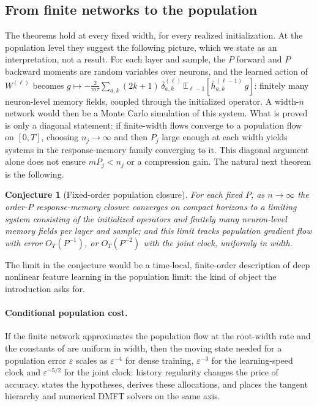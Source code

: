 \documentclass[11pt]{article}
\newtheorem{conjecture}[theorem]{Conjecture}
\theoremstyle{definition}
\theoremstyle{remark}
\newcommand{\E}{\mathbb{E}}
\begin{document}
\subsection{From finite networks to the population}
\label{sec:population-view}

The theorems hold at every fixed width, for every realized initialization.  At
the population level they suggest the following picture, which we state as an
interpretation, not a result.  For each layer and sample, the $P$ forward and
$P$ backward moments are random variables over neurons, and the learned action
of $W^{(\ell)}$ becomes
$g\mapsto-\frac{2}{m\tau}\sum_{a,k}(2k+1)\,\bar\delta^{(\ell)}_{a,k}\,
\E_{\ell-1}[\bar h^{(\ell-1)}_{a,k}\,g]$: finitely many neuron-level memory
fields, coupled through the initialized operator.  A width-$n$ network would then
be a Monte Carlo simulation of this system.  What is proved is only a diagonal
statement: if finite-width flows converge to a population flow on $[0,T]$,
choosing $n_j\to\infty$ and then $P_j$ large enough at each width yields
systems in the response-memory family converging to it.  This diagonal
argument alone does not ensure $mP_j<n_j$ or a compression gain.
The natural next theorem is the following.

\begin{conjecture}[Fixed-order population closure]
\label{conj:population}
For each fixed $P$, as $n\to\infty$ the order-$P$ response-memory closure
converges on compact horizons to a limiting system consisting of the initialized
operators and finitely many neuron-level memory fields per layer and sample; and
this limit tracks population gradient flow with error $O_T(P^{-1})$, or
$O_T(P^{-2})$ with the joint clock, uniformly in width.
\end{conjecture}

The limit in the conjecture would be a time-local, finite-order description of
deep nonlinear feature learning in the population limit: the kind of object the
introduction asks for.

\paragraph{Conditional population cost.}
If the finite network approximates the population flow at the root-width rate
and the constants of  are uniform in width, then the
moving state needed for a population error $\varepsilon$ scales as
$\varepsilon^{-4}$ for dense training, $\varepsilon^{-3}$ for the
learning-speed clock and $\varepsilon^{-5/2}$ for the joint clock: history
regularity changes the price of accuracy.   states the
hypotheses, derives these allocations, and places the tangent hierarchy and
numerical DMFT solvers on the same axis.
\end{document}
